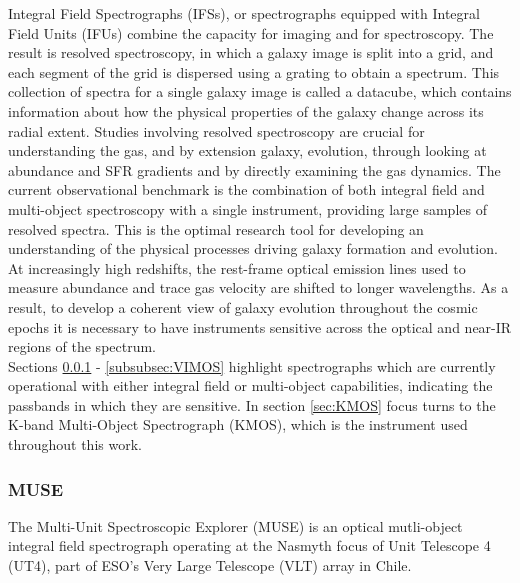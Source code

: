\documentclass{literature}
\begin{document}
Integral Field Spectrographs (IFSs), or spectrographs equipped with Integral Field Units (IFUs) combine the capacity for imaging and for spectroscopy. The result is resolved spectroscopy, in which a galaxy image is split into a grid, and each segment of the grid is dispersed using a grating to obtain a spectrum. This collection of spectra for a single galaxy image is called a datacube, which contains information about how the physical properties of the galaxy change across its radial extent. Studies involving resolved spectroscopy are crucial for understanding the gas, and by extension galaxy, evolution, through looking at abundance and SFR gradients and by directly examining the gas dynamics. The current observational benchmark is the combination of both integral field and multi-object spectroscopy with a single instrument, providing large samples of resolved spectra. This is the optimal research tool for developing an understanding of the physical processes driving galaxy formation and evolution. At increasingly high redshifts, the rest-frame optical emission lines used to measure abundance and trace gas velocity are shifted to longer wavelengths. As a result, to develop a coherent view of galaxy evolution throughout the cosmic epochs it is necessary to have instruments sensitive across the optical and near-IR regions of the spectrum.  \\ 

Sections \ref{subsubsec:MUSE} - \ref{subsubsec:VIMOS} highlight spectrographs which are currently operational with either integral field or multi-object capabilities, indicating the passbands in which they are sensitive. In section \ref{sec:KMOS} focus turns to the K-band Multi-Object Spectrograph (KMOS), which is the instrument used throughout this work.     

\subsubsection{MUSE}\label{subsubsec:MUSE}
The Multi-Unit Spectroscopic Explorer (MUSE) \citep{Bacon2010} is an optical mutli-object integral field spectrograph operating at the Nasmyth focus of Unit Telescope 4 (UT4), part of ESO's Very Large Telescope (VLT) array in Chile. 	
\end{document}
